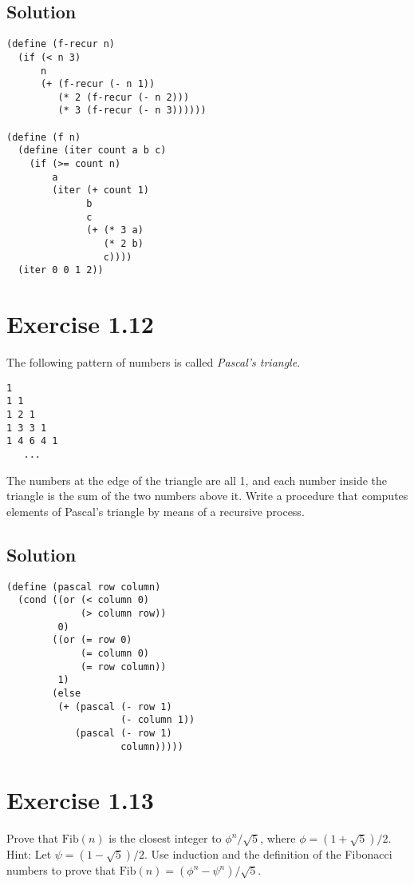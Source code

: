 \documentclass[11pt]{article}
\begin{document}
\subsection{Solution}
\label{sec:org8f466a0}
\begin{verbatim}
(define (f-recur n)
  (if (< n 3)
      n
      (+ (f-recur (- n 1))
         (* 2 (f-recur (- n 2)))
         (* 3 (f-recur (- n 3))))))

(define (f n)
  (define (iter count a b c)
    (if (>= count n)
        a
        (iter (+ count 1)
              b
              c
              (+ (* 3 a)
                 (* 2 b)
                 c))))
  (iter 0 0 1 2))
\end{verbatim}

\section{Exercise 1.12}
\label{sec:org4819307}
The following pattern of numbers is called \emph{Pascal's triangle}.

\begin{verbatim}
1
1 1
1 2 1
1 3 3 1
1 4 6 4 1
   ...
\end{verbatim}

The numbers at the edge of the triangle are all 1, and each number inside the
triangle is the sum of the two numbers above it. Write a procedure that
computes elements of Pascal's triangle by means of a recursive process.
\subsection{Solution}
\label{sec:org5e3d6db}
\begin{verbatim}
(define (pascal row column)
  (cond ((or (< column 0)
             (> column row))
         0)
        ((or (= row 0)
             (= column 0)
             (= row column))
         1)
        (else
         (+ (pascal (- row 1)
                    (- column 1))
            (pascal (- row 1)
                    column)))))
\end{verbatim}

\section{Exercise 1.13}
\label{sec:org6aa625d}
Prove that \(\text{Fib}(n)\) is the closest integer to \(\phi^n/\sqrt{5}\), where \(\phi = (1+\sqrt{5})/2\). Hint: Let \(\psi = (1-\sqrt{5})/2\). Use induction and the definition of the Fibonacci numbers to prove that \(\text{Fib}(n) = (\phi^n - \psi^n)/\sqrt{5}\).
\end{document}
